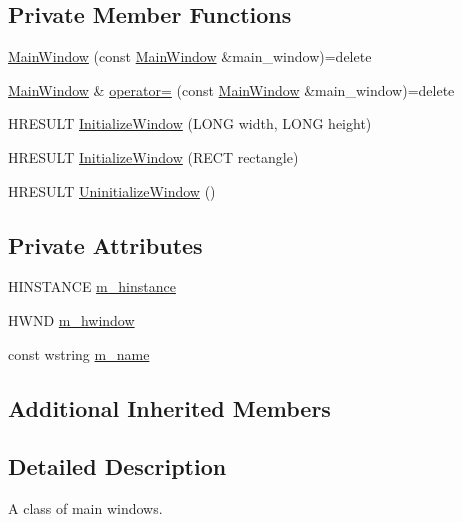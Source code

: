 \subsection*{Private Member Functions}
\begin{DoxyCompactItemize}
\item 
\hyperlink{classmage_1_1_main_window_a8dc3c590bb168f8178a7db72ff60fd0c}{Main\+Window} (const \hyperlink{classmage_1_1_main_window}{Main\+Window} \&main\+\_\+window)=delete
\item 
\hyperlink{classmage_1_1_main_window}{Main\+Window} \& \hyperlink{classmage_1_1_main_window_a0c2414ae4e627fb401c045371c286de0}{operator=} (const \hyperlink{classmage_1_1_main_window}{Main\+Window} \&main\+\_\+window)=delete
\item 
H\+R\+E\+S\+U\+LT \hyperlink{classmage_1_1_main_window_a167b4c2771e6caa819045cf75f9bba5f}{Initialize\+Window} (L\+O\+NG width, L\+O\+NG height)
\item 
H\+R\+E\+S\+U\+LT \hyperlink{classmage_1_1_main_window_a74e01363d59c22597449edfc524a504e}{Initialize\+Window} (R\+E\+CT rectangle)
\item 
H\+R\+E\+S\+U\+LT \hyperlink{classmage_1_1_main_window_aa1ba43fc0a12ea43636fe0e62242a47d}{Uninitialize\+Window} ()
\end{DoxyCompactItemize}
\subsection*{Private Attributes}
\begin{DoxyCompactItemize}
\item 
H\+I\+N\+S\+T\+A\+N\+CE \hyperlink{classmage_1_1_main_window_a389348c5949b2cb464a8236bfcff00ef}{m\+\_\+hinstance}
\item 
H\+W\+ND \hyperlink{classmage_1_1_main_window_afc9afabcf8a52d79f02c8352451863cc}{m\+\_\+hwindow}
\item 
const wstring \hyperlink{classmage_1_1_main_window_a3d8eba5081df97c68b1f2aa7e5d5cb1c}{m\+\_\+name}
\end{DoxyCompactItemize}
\subsection*{Additional Inherited Members}


\subsection{Detailed Description}
A class of main windows. 


